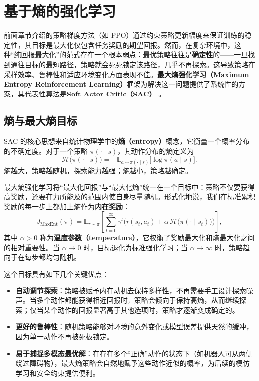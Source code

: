 \section{基于熵的强化学习}

前面章节介绍的策略梯度方法（如 PPO）通过约束策略更新幅度来保证训练的稳定性，其目标是最大化仅包含任务奖励的期望回报。然而，在复杂环境中，这种“纯回报最大化”的范式存在一个根本弱点：最优策略往往是\textbf{确定性}的——一旦找到通往目标的最短路径，策略就会死死锁定该路径，几乎不再探索。这导致策略在采样效率、鲁棒性和适应环境变化方面表现不佳。\textbf{最大熵强化学习（Maximum Entropy Reinforcement Learning）}框架为解决这一问题提供了系统性的方案，其代表性算法是\textbf{Soft Actor-Critic（SAC）} \cite{haarnoja2018soft}。

\subsection{熵与最大熵目标}

SAC 的核心思想来自统计物理学中的\textbf{熵（entropy）}概念，它衡量一个概率分布的不确定度。对于一个策略 $\pi(\cdot \mid s)$，其动作分布的熵定义为
\begin{equation}
\mathcal{H}\big(\pi(\cdot \mid s)\big) = -\mathbb{E}_{a \sim \pi(\cdot \mid s)} \big[ \log \pi(a \mid s) \big].
\end{equation}
熵越大，策略越随机，探索能力越强；熵越小，策略越确定。

最大熵强化学习将“最大化回报”与“最大化熵”统一在一个目标中：策略不仅要获得高奖励，还要在力所能及的范围内使自身尽量随机。形式化地说，我们在标准累积奖励的每一步上都加上熵作为\textbf{内在奖励}：
\begin{equation}
J_{\text{MaxEnt}}(\pi) = \mathbb{E}_{\tau \sim \pi} \left[ \sum_{t=0}^{\infty} \gamma^t \Big( r(s_t, a_t) + \alpha\, \mathcal{H}\big(\pi(\cdot \mid s_t)\big) \Big) \right],
\label{eq:maxent_objective}
\end{equation}
其中 $\alpha > 0$ 称为\textbf{温度参数（temperature）}，它权衡了奖励最大化和熵最大化之间的相对重要性。当 $\alpha \to 0$ 时，目标退化为标准强化学习；当 $\alpha \to \infty$ 时，策略趋向于在每步都均匀随机。

这个目标具有如下几个关键优点：
\begin{itemize}
\item \textbf{自动调节探索}：策略被赋予内在动机去保持多样性，不再需要手工设计探索噪声。当多个动作都能获得相近回报时，策略会倾向于保持高熵，从而继续探索；仅当某个动作的回报显著高于其他选项时，策略才逐渐变成确定的。
\item \textbf{更好的鲁棒性}：随机策略能够对环境的意外变化或模型误差提供天然的缓冲，因为单一动作不再被死板锁定。
\item \textbf{易于捕捉多模态最优解}：在存在多个“正确”动作的状态下（如机器人可从两侧绕过障碍物），最大熵策略会自然地赋予这些动作近似的概率，为后续的模仿学习和安全约束提供便利。
\end{itemize}

